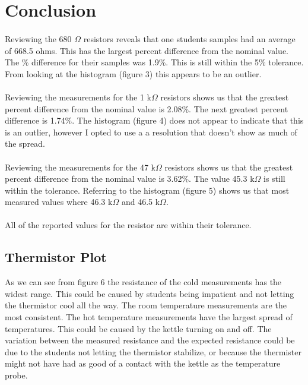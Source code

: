 \documentclass{article}
\begin{document}
\newpage
\section{Conclusion}
\paragraph{}
Reviewing the 680 $\Omega$ resistors reveals that one students samples had an average of 668.5 ohms. This has the largest percent difference from the nominal value. The \% difference for their samples was 1.9\%. This is still within the 5\% tolerance. From looking at the histogram (figure 3) this appears to be an outlier.
\paragraph{}
Reviewing the measurements for the 1 k$\Omega$ resistors shows us that the greatest percent difference from the nominal value is 2.08\%. The next greatest percent difference is 1.74\%. The histogram (figure 4) does not appear to indicate that this is an outlier, however I opted to use a a resolution that doesn't show as much of the spread.
\paragraph{}
Reviewing the measurements for the 47 k$\Omega$ resistors shows us that the greatest percent difference from the nominal value is 3.62\%. The value 45.3 k$\Omega$ is still within the tolerance. Referring to the histogram (figure 5) shows us that most measured values where 46.3 k$\Omega$ and 46.5 k$\Omega$.
\paragraph{}
All of the reported values for the resistor are within their tolerance.

\subsection{Thermistor Plot}
As we can see from figure 6 the resistance of the cold measurements has the widest range. This could be caused by students being impatient and not letting the thermistor cool all the way. The room temperature measurements are the most consistent. The hot temperature measurements have the largest spread of temperatures. This could be caused by the kettle turning on and off. The variation between the measured resistance and the expected resistance could be due to the students not letting the thermistor stabilize, or because the thermister might not have had as good of a contact with the kettle as the temperature probe.
\end{document}

